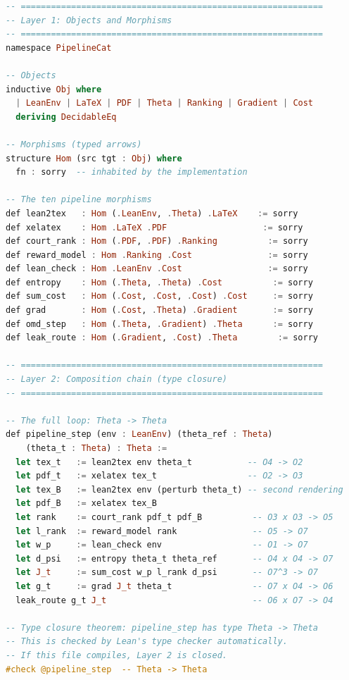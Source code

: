 \documentclass[11pt,a4paper]{article}
\theoremstyle{definition}
\theoremstyle{remark}
\begin{document}
\begin{lstlisting}[language=Haskell,caption={Categorical closure verification --- Lean 4 skeleton}]
-- ============================================================
-- Layer 1: Objects and Morphisms
-- ============================================================
namespace PipelineCat

-- Objects
inductive Obj where
  | LeanEnv | LaTeX | PDF | Theta | Ranking | Gradient | Cost
  deriving DecidableEq

-- Morphisms (typed arrows)
structure Hom (src tgt : Obj) where
  fn : sorry  -- inhabited by the implementation

-- The ten pipeline morphisms
def lean2tex   : Hom (.LeanEnv, .Theta) .LaTeX    := sorry
def xelatex    : Hom .LaTeX .PDF                   := sorry
def court_rank : Hom (.PDF, .PDF) .Ranking          := sorry
def reward_model : Hom .Ranking .Cost               := sorry
def lean_check : Hom .LeanEnv .Cost                 := sorry
def entropy    : Hom (.Theta, .Theta) .Cost          := sorry
def sum_cost   : Hom (.Cost, .Cost, .Cost) .Cost     := sorry
def grad       : Hom (.Cost, .Theta) .Gradient       := sorry
def omd_step   : Hom (.Theta, .Gradient) .Theta      := sorry
def leak_route : Hom (.Gradient, .Cost) .Theta        := sorry

-- ============================================================
-- Layer 2: Composition chain (type closure)
-- ============================================================

-- The full loop: Theta -> Theta
def pipeline_step (env : LeanEnv) (theta_ref : Theta)
    (theta_t : Theta) : Theta :=
  let tex_t   := lean2tex env theta_t           -- O4 -> O2
  let pdf_t   := xelatex tex_t                  -- O2 -> O3
  let tex_B   := lean2tex env (perturb theta_t) -- second rendering
  let pdf_B   := xelatex tex_B
  let rank    := court_rank pdf_t pdf_B          -- O3 x O3 -> O5
  let l_rank  := reward_model rank               -- O5 -> O7
  let w_p     := lean_check env                  -- O1 -> O7
  let d_psi   := entropy theta_t theta_ref       -- O4 x O4 -> O7
  let J_t     := sum_cost w_p l_rank d_psi       -- O7^3 -> O7
  let g_t     := grad J_t theta_t                -- O7 x O4 -> O6
  leak_route g_t J_t                             -- O6 x O7 -> O4

-- Type closure theorem: pipeline_step has type Theta -> Theta
-- This is checked by Lean's type checker automatically.
-- If this file compiles, Layer 2 is closed.
#check @pipeline_step  -- Theta -> Theta


\end{lstlisting}
\end{document}
